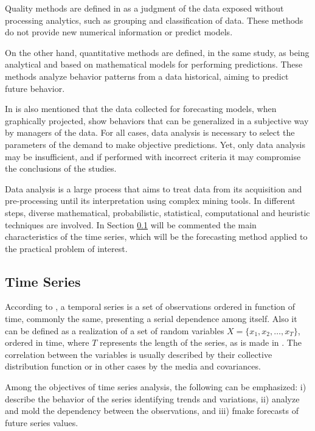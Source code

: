         Quality methods are defined in \cite{Junior2007} as a judgment of the data exposed without processing analytics, such as grouping and classification of data. These methods do not provide new numerical information or predict models.
        
        On the other hand, quantitative methods are defined, in the same study, as being analytical and based on mathematical models for performing predictions. These methods analyze behavior patterns from a data historical, aiming to predict future behavior.
         
        In  is also mentioned that the data collected for forecasting models, when graphically projected, show behaviors that can be generalized in a subjective way by managers of the data. For all cases, data analysis is necessary to select the parameters of the demand to make objective predictions.  Yet, only data analysis may be insufficient, and if performed with incorrect criteria it may compromise the conclusions of the studies. 
        
         Data analysis is a large process that aims to treat data from its acquisition and pre-processing until its interpretation using complex mining tools. In different steps, diverse mathematical, probabilistic, statistical, computational and heuristic techniques are involved.  In Section \ref{sec: timeseries} will be commented the main characteristics of the time series, which will be the forecasting method applied to the practical problem of interest. 
    
        \subsection{Time Series} \label{sec: timeseries} 
         
            According to , a temporal series is a set of observations ordered in function of time, commonly the same, presenting a serial dependence among itself. Also it can be defined as a realization of a set of random variables  $ X=\{x_1, x_2, \dots, x_T\}$, ordered in time, where  $T$ represents the length of the series, as is made in \cite{defts}. The correlation between the variables is usually described by their collective distribution function or in other cases by the media and covariances. 
            
            Among the objectives of time series analysis, the following can be emphasized: i) describe the behavior of the series identifying trends and variations, ii) analyze and mold the dependency between the observations, and iii) fmake forecasts of future series values. 
            
